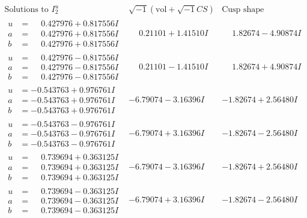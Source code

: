 \documentclass[1p]{elsarticle_modified}
\theoremstyle{definition}
\newcommand{\I}{\sqrt{-1}}
\begin{document}
$$\begin{array}{c|c|c}  
\text{Solutions to }I^u_{2}& \I (\text{vol} + \sqrt{-1}CS) & \text{Cusp shape}\\
 \hline 
\begin{aligned}
u &= \phantom{-}0.427976 + 0.817556 I \\
a &= \phantom{-}0.427976 + 0.817556 I \\
b &= \phantom{-}0.427976 + 0.817556 I\end{aligned}
 & \phantom{-}0.21101 + 1.41510 I & \phantom{-}1.82674 - 4.90874 I \\ \hline\begin{aligned}
u &= \phantom{-}0.427976 - 0.817556 I \\
a &= \phantom{-}0.427976 - 0.817556 I \\
b &= \phantom{-}0.427976 - 0.817556 I\end{aligned}
 & \phantom{-}0.21101 - 1.41510 I & \phantom{-}1.82674 + 4.90874 I \\ \hline\begin{aligned}
u &= -0.543763 + 0.976761 I \\
a &= -0.543763 + 0.976761 I \\
b &= -0.543763 + 0.976761 I\end{aligned}
 & -6.79074 - 3.16396 I & -1.82674 + 2.56480 I \\ \hline\begin{aligned}
u &= -0.543763 - 0.976761 I \\
a &= -0.543763 - 0.976761 I \\
b &= -0.543763 - 0.976761 I\end{aligned}
 & -6.79074 + 3.16396 I & -1.82674 - 2.56480 I \\ \hline\begin{aligned}
u &= \phantom{-}0.739694 + 0.363125 I \\
a &= \phantom{-}0.739694 + 0.363125 I \\
b &= \phantom{-}0.739694 + 0.363125 I\end{aligned}
 & -6.79074 - 3.16396 I & -1.82674 + 2.56480 I \\ \hline\begin{aligned}
u &= \phantom{-}0.739694 - 0.363125 I \\
a &= \phantom{-}0.739694 - 0.363125 I \\
b &= \phantom{-}0.739694 - 0.363125 I\end{aligned}
 & -6.79074 + 3.16396 I & -1.82674 - 2.56480 I \\ \hline\begin{aligned}

\end{aligned}
\end{array}$$
\end{document}
